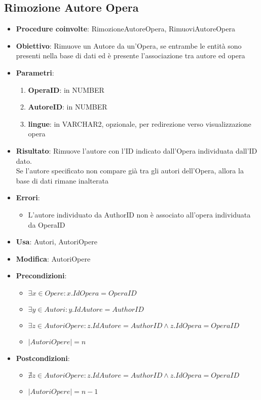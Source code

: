 \label{RimozioneAutoreOpera}
\subsection{Rimozione Autore Opera}
\begin{itemize}
	\item \textbf{Procedure coinvolte}: RimozioneAutoreOpera, RimuoviAutoreOpera
	\item \textbf{Obiettivo}: Rimuove un Autore da un'Opera, se entrambe le entità sono presenti nella base di dati ed è presente l'associazione tra autore ed opera
	\item \textbf{Parametri}:
	\begin{enumerate}
		\item \textbf{OperaID}: in NUMBER
		\item \textbf{AutoreID}: in NUMBER
		\item \textbf{lingue}: in VARCHAR2, opzionale, per redirezione verso visualizzazione opera
	\end{enumerate}
	\item \textbf{Risultato}: Rimuove l'autore con l'ID indicato dall'Opera individuata dall'ID dato.\\
	Se l'autore specificato non compare già tra gli autori dell'Opera, allora la base di dati rimane inalterata
	\item \textbf{Errori}:
	\begin{itemize}
		\item L'autore individuato da AuthorID non è associato all'opera individuata da OperaID
	\end{itemize}
	\item \textbf{Usa}: Autori, AutoriOpere
	\item \textbf{Modifica}: AutoriOpere
	\item \textbf{Precondizioni}:
	\begin{itemize}
		\item $\exists x \in Opere : x.IdOpera = OperaID$
		\item $\exists y \in Autori : y.IdAutore = AuthorID$
		\item $\exists z \in AutoriOpere : z.IdAutore = AuthorID \land z.IdOpera = OperaID$
		\item $|AutoriOpere| = n$
	\end{itemize}
	\item \textbf{Postcondizioni}:
	\begin{itemize}
		\item $\nexists z \in AutoriOpere : z.IdAutore = AuthorID \land z.IdOpera = OperaID$
		\item $|AutoriOpere| = n - 1$
	\end{itemize}
\end{itemize}

